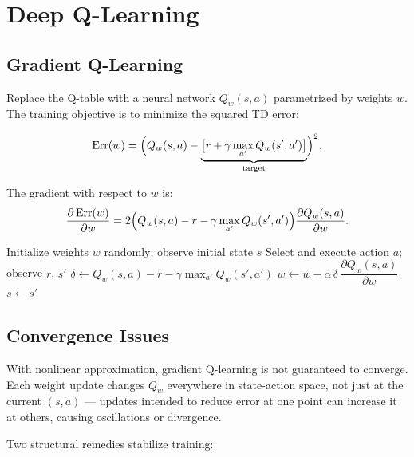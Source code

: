 \documentclass[11pt,a4paper]{article}
\theoremstyle{definition}
\theoremstyle{plain}
\theoremstyle{remark}
\begin{document}
\section{Deep Q-Learning}

\subsection{Gradient Q-Learning}

Replace the Q-table with a neural network $Q_w(s, a)$ parametrized by weights $w$. The training objective is to minimize the squared TD error:

\begin{tcolorbox}[colback=blue!5!white,colframe=blue!75!black,title=\textbf{Deep Q-Learning Objective}]
\[
    \mathrm{Err}(w) = \Bigl(Q_w(s,a) - \underbrace{\bigl[r + \gamma \max_{a'} Q_w(s', a')\bigr]}_{\text{target}}\Bigr)^2. %
\]
\end{tcolorbox}

The gradient with respect to $w$ is:
\[
    \frac{\partial\,\mathrm{Err}(w)}{\partial w} = 2\Bigl(Q_w(s,a) - r - \gamma\max_{a'}Q_w(s',a')\Bigr)\frac{\partial Q_w(s,a)}{\partial w}.
\]

\begin{algorithm}
\caption{Gradient Q-Learning}
\begin{algorithmic}
\STATE Initialize weights $w$ randomly; observe initial state $s$
\LOOP
    \STATE Select and execute action $a$; observe $r$, $s'$
    \STATE $\delta \leftarrow Q_w(s,a) - r - \gamma\max_{a'} Q_w(s',a')$
    \STATE $w \leftarrow w - \alpha\,\delta\,\dfrac{\partial Q_w(s,a)}{\partial w}$
    \STATE $s \leftarrow s'$
\ENDLOOP
\end{algorithmic}
\end{algorithm}

\subsection{Convergence Issues}

With nonlinear approximation, gradient Q-learning is not guaranteed to converge. Each weight update changes $Q_w$ everywhere in state-action space, not just at the current $(s, a)$ — updates intended to reduce error at one point can increase it at others, causing oscillations or divergence.

Two structural remedies stabilize training:
\end{document}
